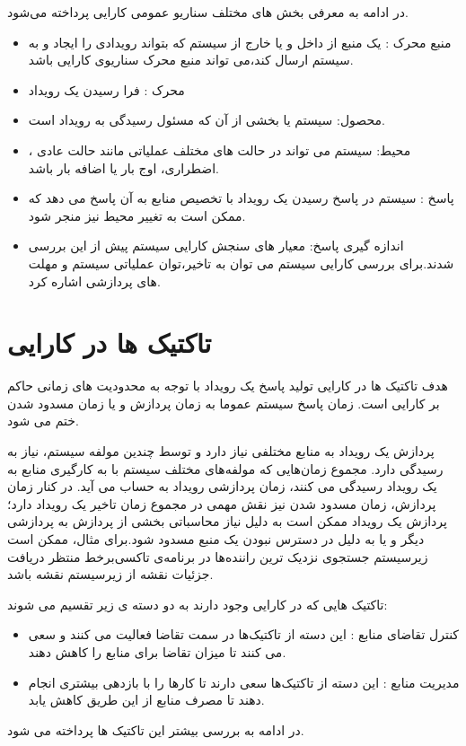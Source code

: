 در ادامه به معرفی بخش های مختلف سناریو عمومی کارایی پرداخته می‌شود.
\begin{itemize}
\item
منبع محرک :
یک منبع از داخل و یا خارج از سیستم که بتواند رویدادی را ایجاد و به سیستم ارسال کند،‌می تواند منبع محرک سناریوی کارایی باشد.
\item
محرک : 
فرا رسیدن یک رویداد
\item
محصول: سیستم یا بخشی از آن که مسئول رسیدگی به رویداد است.
\item
محیط:
سیستم می تواند در حالت های مختلف عملیاتی مانند حالت عادی ، اضطراری، اوج بار یا اضافه بار باشد.
\item
پاسخ :
سیستم در پاسخ رسیدن یک رویداد با تخصیص منابع به آن پاسخ می دهد که ممکن است به تغییر محیط نیز منجر شود.
\item
اندازه گیری پاسخ:
معیار های سنجش کارایی سیستم پیش از این بررسی شدند.برای بررسی کارایی سیستم می توان به تاخیر،‌توان عملیاتی سیستم و مهلت های پردازشی اشاره کرد.
\end{itemize}

\section{تاکتیک ها در کارایی}
هدف تاکتیک ها در کارایی تولید پاسخ یک رویداد با توجه به محدودیت های زمانی حاکم بر کارایی است. زمان پاسخ سیستم عموما به زمان پردازش و یا زمان مسدود شدن  ختم می شود.

پردازش یک رویداد به منابع مختلفی نیاز دارد و توسط چندین مولفه سیستم، نیاز به رسیدگی دارد. مجموع زمان‌هایی که مولفه‌های مختلف سیستم با به کار‌گیری منابع به یک رویداد رسیدگی می کنند،‌ زمان پردازشی رویداد به حساب می آید. در کنار زمان پردازش، زمان مسدود شدن نیز نقش مهمی در مجموع زمان تاخیر یک رویداد دارد؛ پردازش یک رویداد ممکن است به دلیل نیاز محاسباتی بخشی از پردازش به پردازشی دیگر و یا به دلیل در دسترس نبودن یک منبع مسدود شود.برای مثال، ممکن است زیرسیستم جستجوی نزدیک ترین راننده‌ها در برنامه‌ی تاکسی‌برخط منتظر دریافت جزئیات نقشه از زیرسیستم نقشه باشد.

تاکتیک هایی که در کارایی وجود دارند به دو دسته ی زیر تقسیم می شوند:
\begin{itemize}
\item
کنترل تقاضای منابع : این دسته از تاکتیک‌ها در سمت تقاضا فعالیت می کنند و سعی می کنند تا میزان تقاضا برای منابع را کاهش دهند.
\item
مدیریت منابع : این دسته از تاکتیک‌ها سعی دارند تا کار‌ها را با بازدهی بیشتری انجام دهند تا مصرف منابع از این طریق کاهش یابد.
\end{itemize}
در ادامه به بررسی بیشتر این تاکتیک ها پرداخته می شود.
